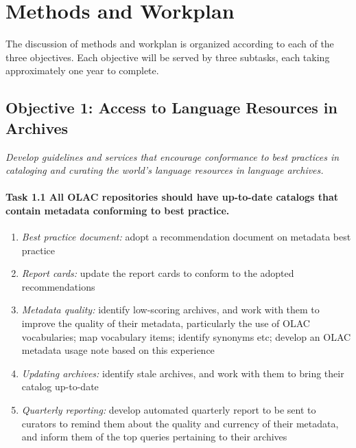 \section{Methods and Workplan}

The discussion of methods and workplan is organized according to
each of the three objectives.  Each objective will be served by
three subtasks, each taking approximately one year to complete.


\subsection*{Objective 1: Access to Language Resources in Archives}

\emph{Develop guidelines and services that encourage conformance to best
practices in cataloging and curating the world's language resources
in language archives.}

\def\task{1.1}
\paragraph{Task {\task} All OLAC repositories should have up-to-date catalogs
      that contain metadata conforming to best practice.}

\begin{enumerate}[label=\emph{\task\alph*}]
\item \emph{Best practice document:}
  adopt a recommendation document on metadata best practice
\item \emph{Report cards:}
  update the report cards to conform to the adopted recommendations
\item \emph{Metadata quality:}
  identify low-scoring archives, and work with them to
  improve the quality of their metadata, particularly the
  use of OLAC vocabularies; map vocabulary items; identify synonyms etc;
  develop an OLAC metadata usage note based on this experience
\item \emph{Updating archives:}
  identify stale archives, and work with them to bring their 
  catalog up-to-date
\item \emph{Quarterly reporting:}
  develop automated quarterly report to be sent to curators to 
  remind them about the quality and currency of their metadata, and 
  inform them of the top queries pertaining to their archives
\end{enumerate}

\def\task{1.2}
